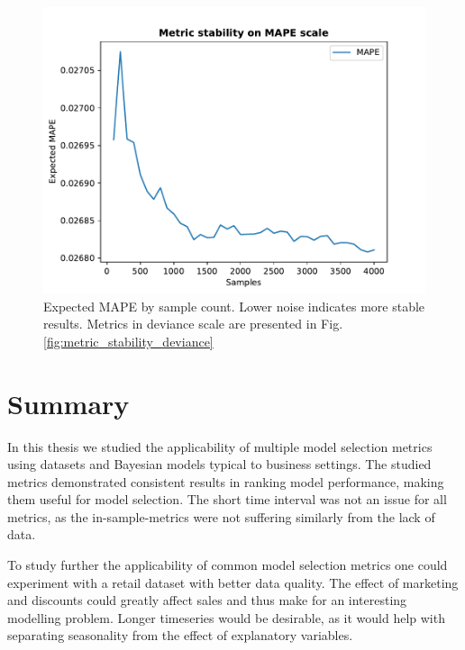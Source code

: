 \documentclass[english, 12pt, a4paper, sci, utf8, a-1b, online]{aaltothesis}
\begin{document}
\begin{abstractpage}[english]
\begin{figure}[hbt]
	\centering
	\includegraphics{../plots/stability/metric_stability_MAPE.pdf}
	\caption{\label{fig:metric_stability_mape}Expected MAPE by sample count. Lower noise indicates more stable results. Metrics in deviance scale are presented in Fig. \ref{fig:metric_stability_deviance}}
\end{figure}

\section{Summary} 



In this thesis we studied the applicability of multiple model selection metrics using datasets and Bayesian models typical to business settings. The studied metrics demonstrated consistent results in ranking model performance, making them useful for model selection. The short time interval was not an issue for all metrics, as the in-sample-metrics were not suffering similarly from the lack of data.

To study further the applicability of common model selection metrics one could experiment with a retail dataset with better data quality. The effect of marketing and discounts could greatly affect sales and thus make for an interesting modelling problem. Longer timeseries would be desirable, as it would help with separating seasonality from the effect of explanatory variables.


\end{abstractpage}
\end{document}
